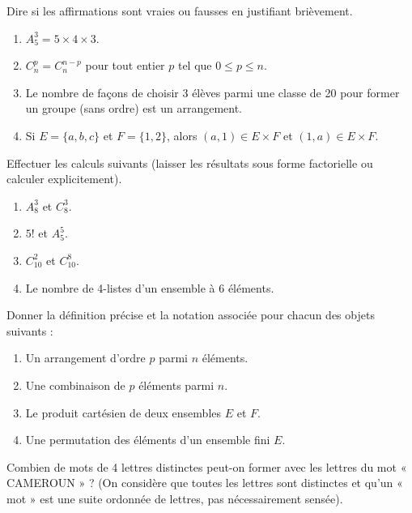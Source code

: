 \documentclass[11pt]{article}
\newcounter{popsec}
\newcounter{popsub}
\newcommand{\courssub}[1]{%
  \stepcounter{popsub}%
  \par\vspace{9pt}\noindent{\popxbold\fontsize{11.5}{13}\selectfont\color{popink}{\color{poporange}\thepopsec.\thepopsub}\hspace{6pt}#1}\par\nopagebreak\vspace{4pt}
}
\begin{document}
\begin{exercice}
Dire si les affirmations sont vraies ou fausses en justifiant brièvement.
\begin{enumerate}
    \item $A_5^3 = 5 \times 4 \times 3$.
    \item $C_n^p = C_n^{n-p}$ pour tout entier $p$ tel que $0 \le p \le n$.
    \item Le nombre de façons de choisir 3 élèves parmi une classe de 20 pour former un groupe (sans ordre) est un arrangement.
    \item Si $E = \{a,b,c\}$ et $F = \{1,2\}$, alors $(a,1) \in E \times F$ et $(1,a) \in E \times F$.
\end{enumerate}
\end{exercice}

\begin{exercice}
Effectuer les calculs suivants (laisser les résultats sous forme factorielle ou calculer explicitement).
\begin{enumerate}
    \item $A_8^3$ et $C_8^3$.
    \item $5!$ et $A_5^5$.
    \item $C_{10}^2$ et $C_{10}^8$.
    \item Le nombre de 4-listes d'un ensemble à 6 éléments.
\end{enumerate}
\end{exercice}

\begin{exercice}
Donner la définition précise et la notation associée pour chacun des objets suivants :
\begin{enumerate}
    \item Un arrangement d'ordre $p$ parmi $n$ éléments.
    \item Une combinaison de $p$ éléments parmi $n$.
    \item Le produit cartésien de deux ensembles $E$ et $F$.
    \item Une permutation des éléments d'un ensemble fini $E$.
\end{enumerate}
\end{exercice}

\courssub{Je m'entraîne}

\begin{exercice}
Combien de mots de 4 lettres distinctes peut-on former avec les lettres du mot « CAMEROUN » ?
(On considère que toutes les lettres sont distinctes et qu'un « mot » est une suite ordonnée de lettres, pas nécessairement sensée).
\end{exercice}
\end{document}

